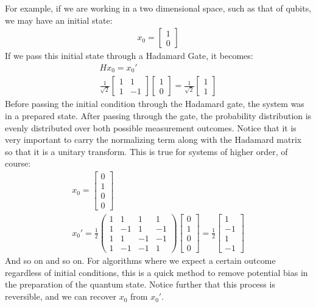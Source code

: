 For example, if we are working in a two dimensional space, such as that of qubits, we may have an initial state:
\begin{align}
x_0=\begin{bmatrix}
1 \\ 0
\end{bmatrix}
\end{align}
If we pass this initial state through a Hadamard Gate, it becomes:
\begin{align}
H x_0=x_0'\\
\frac{1}{\sqrt{2}}\begin{bmatrix}
1 & 1\\1 & -1
\end{bmatrix}\begin{bmatrix}
1 \\ 0
\end{bmatrix}=\frac{1}{\sqrt{2}}\begin{bmatrix}
1 \\ 1
\end{bmatrix}
\end{align}
Before passing the initial condition through the Hadamard gate, the system was in a prepared state. After passing through the gate, the probability distribution is evenly distributed over both possible measurement outcomes. Notice that it is very important to carry the normalizing term along with the Hadamard matrix so that it is a unitary transform. This is true for systems of higher order, of course:
\begin{align}
x_0=\begin{bmatrix}
0 \\ 1 \\ 0 \\0 
\end{bmatrix}\\
x_0'=\frac{1}{2}\left(\begin{array}{cccc} 1 & 1 & 1 & 1\\ 1 & -1 & 1 & -1\\ 1 & 1 & -1 & -1\\ 1 & -1 & -1 & 1 \end{array}\right)\begin{bmatrix}
0 \\ 1 \\ 0 \\0 
\end{bmatrix}=\frac{1}{2}\begin{bmatrix}
1 \\ -1 \\1\\-1
\end{bmatrix}
\end{align}
And so on and so on. For algorithms where we expect a certain outcome regardless of initial conditions, this is a quick method to remove potential bias in the preparation of the quantum state. Notice further that this process is reversible, and we can recover $x_0$ from $x_0'$.

